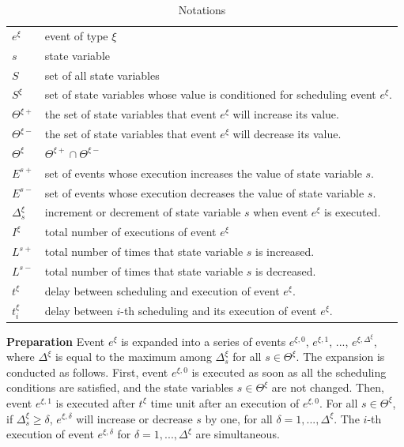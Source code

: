 \documentclass[]{interact}
\theoremstyle{plain}%
\theoremstyle{definition}
\theoremstyle{remark}
\begin{document}
\begin{table}[h]
	\begin{tabular}{ll}
		$e^{\xi}$ & event of type $\xi$\\
		$s$& state variable\\
		$S$& set of all state variables\\
		$S^{\xi}$  & set of state variables whose value is conditioned for scheduling event $e^{\xi}$.\\
		$\Theta^{\xi+}$ & the set of state variables that event $e^{\xi}$ will increase its value.\\
		$\Theta^{\xi-}$ & the set of state variables that event $e^{\xi}$ will decrease its value.\\
		$\Theta^{\xi}$ & $\Theta^{\xi+}\cap\Theta^{\xi-}$\\
		$E^{s+}$ & set of events whose execution increases the value of state variable $s$.\\
		$E^{s-}$  & set of events whose execution decreases the value of state variable $s$.\\
		$\Delta^{\xi}_s$ & increment or decrement of state variable $s$ when event $e^{\xi}$ is executed.\\
		$I^{\xi}$ & total number of executions of event $e^{\xi}$\\
		$L^{s+}$& total number of  times that state variable $s$ is increased.\\
		$L^{s-}$ & total number of  times that state variable $s$ is decreased.\\
		$t^{\xi}$ & delay between scheduling and execution of event $e^{\xi}$.\\
		$t^{\xi}_i$ & delay between $i$-th scheduling and its execution of event $e^{\xi}$.\\
	\end{tabular}
\caption{Notations}
\end{table}


\textbf{Preparation} Event $e^{\xi}$ is expanded into a series of events $e^{\xi,0}$, $e^{\xi,1}$, ..., $e^{\xi,\Delta^{\xi}}$, where $\Delta^{\xi}$ is equal to the maximum among $\Delta^{\xi}_s$ for all $s\in \Theta^{\xi}$. The expansion is conducted as follows. First, event $e^{\xi,0}$ is executed as soon as all the scheduling conditions are satisfied, and the state variables $s\in \Theta^{\xi}$ are not changed. Then, event $e^{\xi,1}$ is executed after $t^{\xi}$ time unit after an execution of $e^{\xi,0}$. For all $s\in \Theta^{\xi}$, if $\Delta^{\xi}_s\ge \delta$,  $e^{\xi,\delta}$ will increase or decrease $s$ by one, for all $\delta=1,...,\Delta^{\xi}$. The $i$-th execution of event $e^{\xi,\delta}$ for $\delta=1,...,\Delta^{\xi}$ are simultaneous.
\end{document}
